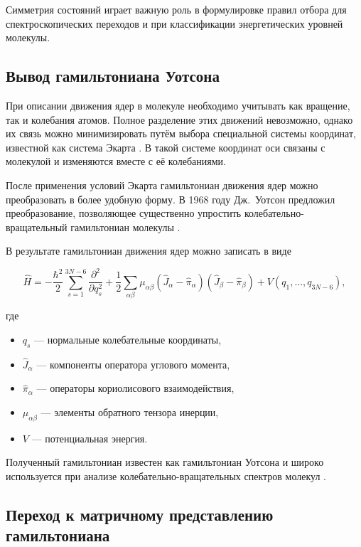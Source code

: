 Симметрия состояний играет важную роль
в формулировке правил отбора для спектроскопических переходов
и при классификации энергетических уровней молекулы.

\subsection{Вывод гамильтониана Уотсона}

При описании движения ядер в молекуле
необходимо учитывать как вращение,
так и колебания атомов.
Полное разделение этих движений невозможно,
однако их связь можно минимизировать
путём выбора специальной системы координат,
известной как система Экарта \cite{Eckart1935,BunkerJensen1998}.
В такой системе координат оси связаны с молекулой
и изменяются вместе с её колебаниями.

После применения условий Экарта
гамильтониан движения ядер можно преобразовать
в более удобную форму.
В 1968 году Дж.~Уотсон предложил преобразование,
позволяющее существенно упростить
колебательно-вращательный гамильтониан молекулы
\cite{Watson1968}.

В результате гамильтониан движения ядер
можно записать в виде

\begin{equation}
\hat{H} =
-\frac{\hbar^2}{2}\sum_{s=1}^{3N-6}
\frac{\partial^2}{\partial q_s^2}
+
\frac{1}{2}
\sum_{\alpha\beta}
\mu_{\alpha\beta}
(\hat{J}_\alpha - \hat{\pi}_\alpha)
(\hat{J}_\beta - \hat{\pi}_\beta)
+V(q_1,\ldots,q_{3N-6}),
\end{equation}

где

\begin{itemize}
\item $q_s$ — нормальные колебательные координаты,
\item $\hat{J}_\alpha$ — компоненты оператора углового момента,
\item $\hat{\pi}_\alpha$ — операторы кориолисового взаимодействия,
\item $\mu_{\alpha\beta}$ — элементы обратного тензора инерции,
\item $V$ — потенциальная энергия.
\end{itemize}

Полученный гамильтониан известен как гамильтониан Уотсона
и широко используется при анализе
колебательно-вращательных спектров молекул
\cite{Watson1968,Watson1977}.

\subsection{Переход к матричному представлению гамильтониана}

